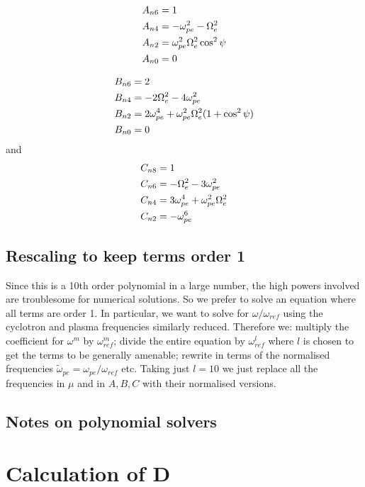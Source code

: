 \documentclass[]{article}
\begin{document}
\begin{align}
A_{n6} &=  1\notag\\
A_{n4} &= -\omega_{pe}^2- \Omega_e^2  \notag\\
A_{n2} &= \omega_{pe}^2 \Omega_e^2\cos^2\psi \notag\\
A_{n0} &= 0
\end{align}

\begin{align}
B_{n6} &= 2\notag\\
B_{n4} &= -2 \Omega_e^2 - 4 \omega_{pe}^2\notag\\
B_{n2} &=   2 \omega_{pe}^4 + \omega_{pe}^2 \Omega_e^2 (1+\cos^2\psi)\notag\\
B_{n0} &= 0
\end{align}
and
\begin{align}
C_{n8} &= 1\notag\\
C_{n6} &= -\Omega_e^2 - 3\omega_{pe}^2\notag\\
C_{n4} &= 3\omega_{pe}^4 + \omega_{pe}^2 \Omega_e^2 \notag\\
C_{n2} &= -\omega_{pe}^6
\end{align}

\subsection{Rescaling to keep terms order 1}
Since this is a 10th order polynomial in a large number, the high powers involved are troublesome for numerical solutions. So we prefer to solve an equation where all terms are order 1. In particular, we want to solve for $\omega/\omega_{ref}$ using the cyclotron and plasma frequencies similarly reduced. Therefore we:
multiply the coefficient for $\omega^m$ by $\omega_{ref}^m$; divide the entire equation by $\omega_{ref}^{l}$ where $l$ is chosen to get the terms to be generally amenable; rewrite in terms of the normalised frequencies $\tilde{\omega}_{pe} = \omega_{pe}/\omega_{ref}$ etc. Taking just $l=10$ we just replace all the frequencies in $\mu$ and in $A, B,C$ with their normalised versions. 

\subsection{Notes on polynomial solvers}

\section{Calculation of D}
\end{document}
